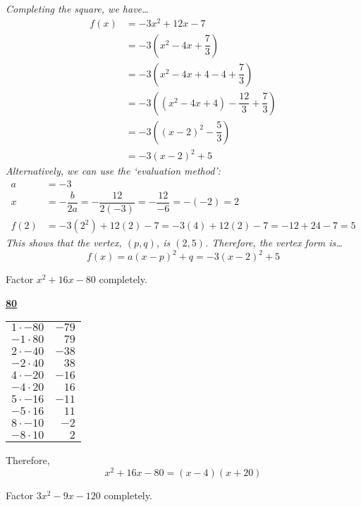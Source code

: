\documentclass[12pt,letterpaper]{exam}
\begin{document}
\begin{questions}
{\itshape Completing the square, we have\dots
	\[
	\begin{aligned}
	f(x)&= -3x^2 + 12x - 7 \\
	&= -3 \left( x^2 - 4x + \dfrac{7}{3} \right) \\
	&= -3 \left( x^2 - 4x + 4 - 4 + \dfrac{7}{3} \right) \\
	&= -3 \left( (x^2 - 4x + 4) - \dfrac{12}{3} + \dfrac{7}{3} \right) \\
	&= -3 \left( (x - 2)^2 - \dfrac{5}{3} \right) \\
	&= -3(x - 2)^2 + 5
	\end{aligned}
	\] \pspace
Alternatively, we can use the `evaluation method':
	\[
	\begin{aligned}
	a&= -3 \\
	x&= -\dfrac{b}{2a}= -\dfrac{12}{2(-3)}= -\dfrac{12}{-6}= -(-2)= 2 \\
	f(2)&= -3(2^2) + 12(2) - 7= -3(4) + 12(2) - 7= -12 + 24 - 7= 5
	\end{aligned}
	\]
This shows that the vertex, $(p, q)$, is $(2, 5)$. Therefore, the vertex form is\dots
	\[
	f(x)= a(x - p)^2 + q= -3(x - 2)^2 + 5
	\]
}



\newpage
\question[10] Factor $x^2 + 16x - 80$ completely. \pspace

{\itshape
	\begin{table}[!ht]
	\centering
	\underline{\bfseries 80} \pvspace{0.2cm}
	\begin{tabular}{rr}
	$1 \cdot -80$ & $-79$ \\
	$-1 \cdot 80$ & $79$ \\
	$2 \cdot -40$ & $-38$ \\
	$-2 \cdot 40$ & $38$ \\
	$4 \cdot -20$ & $-16$ \\ \hline
	\multicolumn{1}{|r}{$-4 \cdot 20$} & \multicolumn{1}{r|}{$16$} \\ \hline
	$5 \cdot -16$ & $-11$ \\
	$-5 \cdot 16$ & $11$ \\
	$8 \cdot -10$ & $-2$ \\
	$-8 \cdot 10$ & $2$
	\end{tabular}
	\end{table}

Therefore,
	\[
	x^2 + 16x - 80= (x - 4)(x + 20)
	\] 
}



\newpage
\question[10] Factor $3x^2 - 9x - 120$ completely. \pspace


\end{questions}
\end{document}
